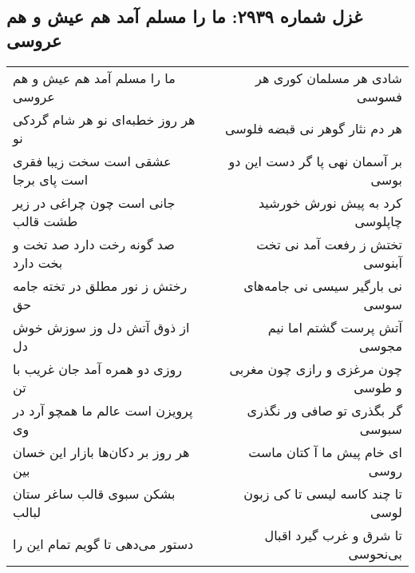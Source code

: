 \begin{center}
\section*{غزل شماره ۲۹۳۹: ما را مسلم آمد هم عیش و هم عروسی}
\label{sec:2939}
\begin{longtable}{l p{0.5cm} r}
ما را مسلم آمد هم عیش و هم عروسی
&&
شادی هر مسلمان کوری هر فسوسی
\\
هر روز خطبه‌ای نو هر شام گردکی نو
&&
هر دم نثار گوهر نی قبضه فلوسی
\\
عشقی است سخت زیبا فقری است پای برجا
&&
بر آسمان نهی پا گر دست این دو بوسی
\\
جانی است چون چراغی در زیر طشت قالب
&&
کرد به پیش نورش خورشید چاپلوسی
\\
صد گونه رخت دارد صد تخت و بخت دارد
&&
تختش ز رفعت آمد نی تخت آبنوسی
\\
رختش ز نور مطلق در تخته جامه حق
&&
نی بارگیر سیسی نی جامه‌های سوسی
\\
از ذوق آتش دل وز سوزش خوش دل
&&
آتش پرست گشتم اما نیم مجوسی
\\
روزی دو همره آمد جان غریب با تن
&&
چون مرغزی و رازی چون مغربی و طوسی
\\
پرویزن است عالم ما همچو آرد در وی
&&
گر بگذری تو صافی ور نگذری سبوسی
\\
هر روز بر دکان‌ها بازار این خسان بین
&&
ای خام پیش ما آ کتان ماست روسی
\\
بشکن سبوی قالب ساغر ستان لبالب
&&
تا چند کاسه لیسی تا کی زبون لوسی
\\
دستور می‌دهی تا گویم تمام این را
&&
تا شرق و غرب گیرد اقبال بی‌نحوسی
\\
\end{longtable}
\end{center}
